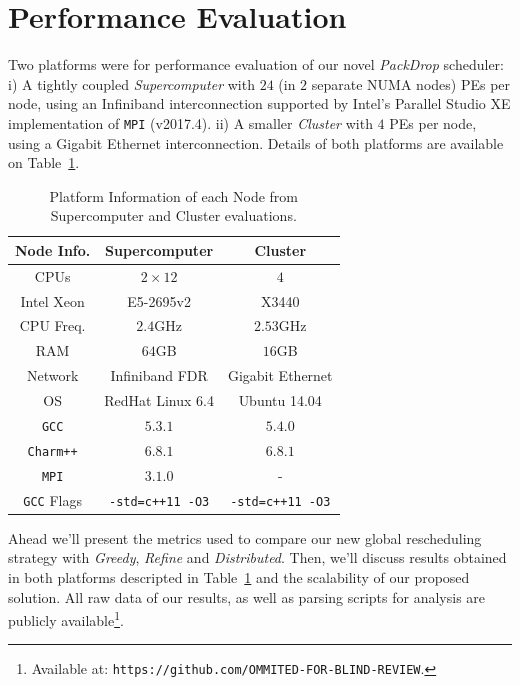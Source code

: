 \section{Performance Evaluation}

Two platforms were for performance evaluation of our novel \textit{PackDrop} scheduler:
i) A tightly coupled \textit{Supercomputer} with $24$ (in $2$ separate NUMA nodes) PEs per node, using an Infiniband interconnection supported by Intel's Parallel Studio XE implementation of \texttt{MPI} (v2017.4).
ii) A smaller \textit{Cluster} with $4$ PEs per node, using a Gigabit Ethernet interconnection.
Details of both platforms are available on Table~\ref{tab:ptinfo}.

\begin{table}[ht]
    \centering
    \caption{Platform Information of each Node from Supercomputer and Cluster evaluations.}
	\begin{tabular}{c|c|c}
	Node Info.	 		& Supercomputer 		& Cluster \\ \hline
        CPUs	   			& $2\times12$ 			& $4$ \\
        Intel Xeon			& E5-2695v2 			& X3440\\
        CPU Freq.  			& $2.4$GHz   			& $2.53$GHz\\
        RAM        			& $64$GB			& $16$GB\\
        Network 			& Infiniband FDR 		& Gigabit Ethernet\\
        OS      			& RedHat Linux 6.4 		& Ubuntu 14.04\\
        \texttt{GCC}			& $5.3.1$			& $5.4.0$\\
        \texttt{Charm++} 		& $6.8.1$ 			& $6.8.1$\\
        \texttt{MPI}			& $3.1.0$			& -\\
        \texttt{GCC} Flags		& \texttt{-std=c++11 -O3} 	& \texttt{-std=c++11 -O3} \\
	\end{tabular}
    \label{tab:ptinfo}
\end{table}

Ahead we'll present the metrics used to compare our new global rescheduling strategy with \textit{Greedy}, \textit{Refine} and \textit{Distributed}.
Then, we'll discuss results obtained in both platforms descripted in Table~\ref{tab:ptinfo} and the scalability of our proposed solution.
All raw data of our results, as well as parsing scripts for analysis are publicly available\footnote{Available at: \texttt{https://github.com/OMMITED-FOR-BLIND-REVIEW}.}.

